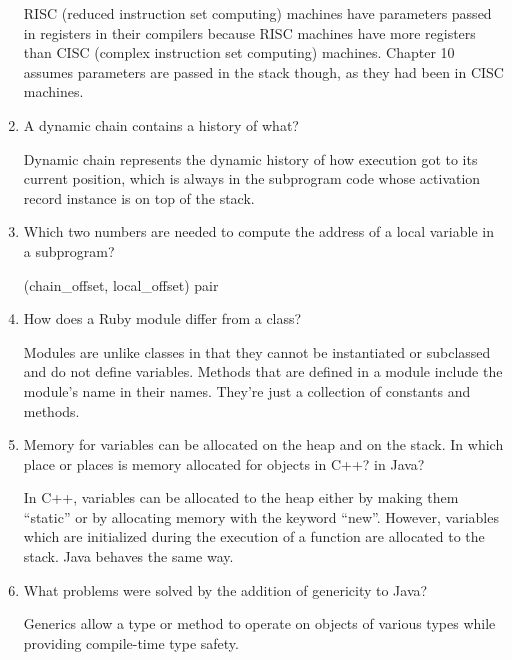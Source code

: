 \begin{enumerate}
	\begin{answer}
RISC (reduced instruction set computing) machines have parameters passed in registers in their compilers because RISC machines have more registers than CISC (complex instruction set computing) machines. Chapter 10 assumes parameters are passed in the stack though, as they had been in CISC machines.
	\end{answer}

  \item A dynamic chain contains a history of what?

	\begin{answer}
Dynamic chain represents the dynamic history of how execution got to its current position, which is always in the subprogram code whose activation record instance is on top of the stack.
	\end{answer}

  \item Which two numbers are needed to compute
    the address of a local variable in a subprogram?

	\begin{answer}
	(chain_offset, local_offset) pair
	\end{answer}

  \item How does a Ruby module differ from a class?

	\begin{answer}
Modules are unlike classes in that they cannot be instantiated or subclassed and do not define variables. Methods that are defined in a module include the  module’s name in their names. They're just a collection of constants and methods.
	\end{answer}

  \item Memory for variables can be allocated on the heap
    and on the stack. In which place or places is memory
    allocated for objects in C++? in Java?

	\begin{answer}
In C++, variables can be allocated to the heap either by making them “static” or by allocating memory with the keyword “new”. However, variables which are initialized during the execution of a function are allocated to the stack. Java behaves the same way. 
	\end{answer}

  \item What problems were solved by the addition
    of genericity to Java?
        \begin{answer}
Generics allow a type or method to operate on objects of various types while providing compile-time type safety.
	\end{answer}


\end{enumerate}
